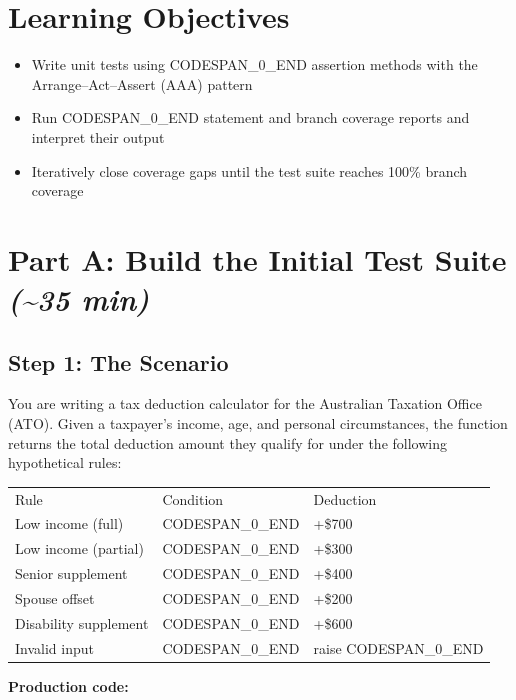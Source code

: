 \documentclass[11pt,a4paper]{book}
\begin{document}
\medskip

\section{Learning Objectives}

\begin{itemize}
  \item Write unit tests using CODESPAN\_0\_END assertion methods with the Arrange--Act--Assert (AAA) pattern
  \item Run CODESPAN\_0\_END statement and branch coverage reports and interpret their output
  \item Iteratively close coverage gaps until the test suite reaches 100\% branch coverage
\end{itemize}

\medskip

\section{Part A: Build the Initial Test Suite \textit{(\textasciitilde{}35 min)}}

\subsection{Step 1: The Scenario}

You are writing a tax deduction calculator for the Australian Taxation Office (ATO). Given a taxpayer's income, age, and personal circumstances, the function returns the total deduction amount they qualify for under the following hypothetical rules:

\begin{tabular}{lll}
\hline
Rule & Condition & Deduction \\
Low income (full) & CODESPAN\_0\_END & +\$700 \\
Low income (partial) & CODESPAN\_0\_END & +\$300 \\
Senior supplement & CODESPAN\_0\_END & +\$400 \\
Spouse offset & CODESPAN\_0\_END & +\$200 \\
Disability supplement & CODESPAN\_0\_END & +\$600 \\
Invalid input & CODESPAN\_0\_END & raise CODESPAN\_0\_END \\
\hline
\end{tabular}

\textbf{Production code:}
\end{document}
